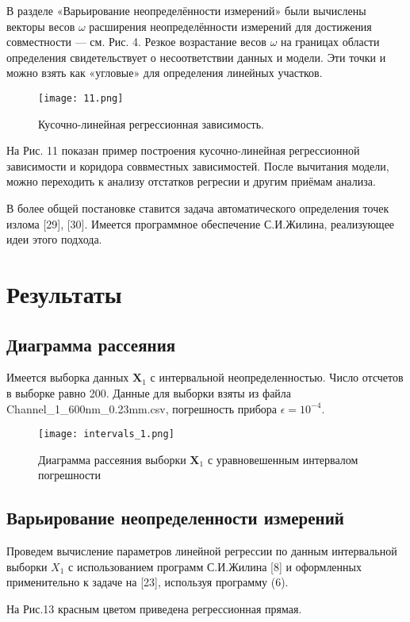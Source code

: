 \documentclass{article}
\begin{document}
	В разделе «Варьирование неопределённости измерений» были вычислены векторы весов $\omega$ расширения неопределённости измерений для достижения совместности — см. Рис. 4. Резкое возрастание весов $\omega$ на границах области определения свидетельствует о несоответствии данных и модели. Эти точки и можно взять как «угловые» для определения линейных участков.
	\begin{figure}[H]
		\centering
		\texttt{[image: 11.png]}
		\caption{ Кусочно-линейная регрессионная зависимость.}
		\label{fig:eleven}
	\end{figure}
	На Рис. 11 показан пример построения кусочно-линейная регрессионной зависимости и коридора соввместных зависимостей. После вычитания модели, можно переходить к анализу отстатков регресии и другим приёмам анализа.
	
	В более общей постановке ставится задача автоматического определения точек излома [29], [30]. Имеется программное обеспечение
	С.И.Жилина, реализующее идеи этого подхода.
	\newpage
	\section{Результаты}
	
	\subsection{Диаграмма рассеяния}
	
	Имеется выборка данных $\mathbf{X}_1$ с интервальной неопределенностью. Число отсчетов в выборке равно 200. Данные для выборки взяты из файла Channel\_1\_600nm\_0.23mm.csv, погрешность прибора $\epsilon = 10^{-4}$.
	\begin{figure}[H]
		\centering
		\texttt{[image: intervals\_1.png]}
		\caption{Диаграмма рассеяния выборки $\mathbf{X}_1$ с уравновешенным интервалом погрешности}
	\end{figure}

	\subsection{Варьирование неопределенности измерений}
	Проведем вычисление параметров линейной регрессии по данным интервальной выборки $X_1$ с использованием программ С.И.Жилина [8] и оформленных применительно к задаче на [23], используя программу (6).

 На Рис.13 красным цветом приведена регрессионная прямая.
\end{document}
